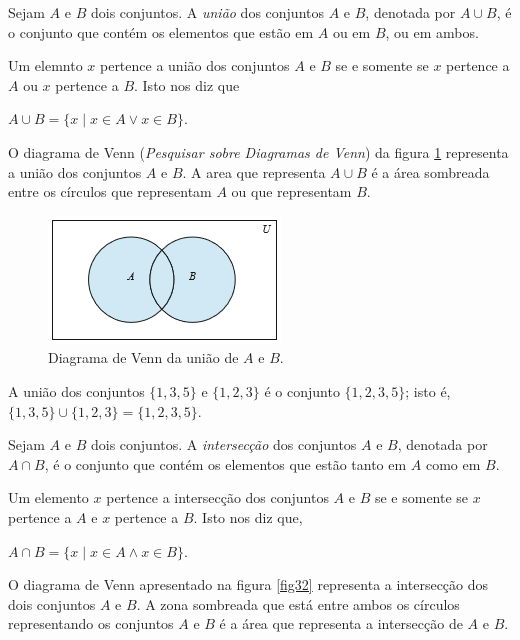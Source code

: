 \begin{defn}
\label{def310}
Sejam $A$ e $B$ dois conjuntos. A \emph{união} dos conjuntos $A$ e $B$, denotada
por $A \cup B$, é o conjunto que contém os elementos que estão em $A$ ou em $B$,
ou em ambos.
\end{defn}

Um elemnto $x$ pertence a união dos conjuntos $A$ e $B$ se e somente se $x$
pertence a $A$ ou $x$ pertence a $B$. Isto nos diz que
\begin{center}
$A \cup B = \{x \mid x\in A \lor x\in B\}.$
\end{center}

O diagrama de Venn (\emph{Pesquisar sobre Diagramas de Venn}) da figura
\ref{fig31} representa a união dos conjuntos $A$ e $B$. A area que representa
$A \cup B$ é a área sombreada entre os círculos que representam $A$ ou que
representam $B$.

\begin{figure}[H]
	\centering
	\includegraphics[scale=2]{chapter/imagens/31}
	\caption{Diagrama de Venn da união de $A$ e $B$.}
	\label{fig31}
\end{figure}

\begin{exmp}
\label{exem315}
A união dos conjuntos $\{1,3,5\}$ e $\{1,2,3\}$ é o conjunto $\{1,2,3,5\}$; isto
é, $\{1,3,5\} \cup \{1,2,3\} = \{1,2,3,5\}$.
\end{exmp}

\begin{defn}
\label{def311}
Sejam $A$ e $B$ dois conjuntos. A \emph{intersecção} dos conjuntos $A$ e $B$,
denotada por $A \cap B$, é o conjunto que contém os elementos que estão tanto em
$A$ como em $B$.
\end{defn}

Um elemento $x$ pertence a intersecção dos conjuntos $A$ e $B$ se e somente se
$x$ pertence a $A$ e $x$ pertence a $B$. Isto nos diz que,
\begin{center}
$A \cap B = \{x \mid x \in A \land x \in B\}$.
\end{center}

O diagrama de Venn apresentado na figura \ref{fig32} representa a intersecção
dos dois conjuntos $A$ e $B$. A zona sombreada que está entre ambos os círculos
representando os conjuntos $A$ e $B$ é a área que representa a intersecção de
$A$ e $B$.


